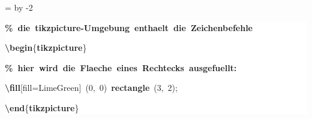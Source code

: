 \begingroup
\ttfamily
{}
=\textwidth
\advance{} by -2\fboxsep
\noindent
\colorbox{background}
{%
\parbox{\dimen255}
{%
\rule[-0.5ex]{0pt}{2.5ex}\hspace*{0.0em}\textcolor{G}{\textbf{\%~die~tikzpicture{-}Umgebung~enthaelt~die~Zeichenbefehle}}\\
\rule[-0.5ex]{0pt}{2.5ex}\hspace*{0.0em}\textcolor{R}{\textbf{\textbackslash{}begin}}\{\textcolor{R}{\textbf{tikzpicture}}\}\\
\rule[-0.5ex]{0pt}{2.5ex}\hspace*{1.0em}\textcolor{G}{\textbf{\%~hier~wird~die~Flaeche~eines~Rechtecks~ausgefuellt:}}\\
\rule[-0.5ex]{0pt}{2.5ex}\hspace*{1.0em}\textcolor{R}{\textbf{\textbackslash{}fill}}[fill=LimeGreen]~(0,~0)~\textcolor{R}{\textbf{rectangle}}~(3,~2);\\
\rule[-0.5ex]{0pt}{2.5ex}\hspace*{0.0em}\textcolor{R}{\textbf{\textbackslash{}end}}\{\textcolor{R}{\textbf{tikzpicture}}\}}%
}%
\endgroup
